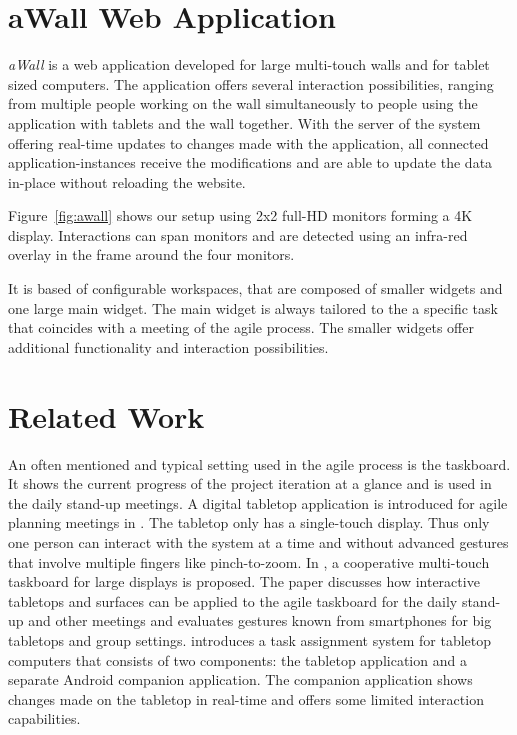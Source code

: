 \documentclass{sigchi}
\begin{document}
\section{aWall Web Application}

\textit{aWall} is a web application developed for large multi-touch walls and for tablet sized computers.
The application offers several interaction possibilities, ranging from multiple people working on the wall simultaneously to people using the application with tablets and the wall together.
With the server of the system offering real-time updates to changes made with the application, all connected application-instances receive the modifications and are able to update the data in-place without reloading the website.

Figure~\ref{fig:awall} shows our setup using 2x2 full-HD monitors forming a 4K display.
Interactions can span monitors and are detected using an infra-red overlay in the frame around the four monitors.

It is based of configurable workspaces, that are composed of smaller widgets and one large main widget.
The main widget is always tailored to the a specific task that coincides with a meeting of the agile process.
The smaller widgets offer additional functionality and interaction possibilities.


\section{Related Work}
An often mentioned and typical setting used in the agile process is the taskboard.
It shows the current progress of the project iteration at a glance and is used in the daily stand-up meetings. 
A digital tabletop application is introduced for agile planning meetings in \cite{Ghanam:4599452}. 
The tabletop only has a single-touch display. 
Thus only one person can interact with the system at a time and without advanced gestures that involve multiple fingers like pinch-to-zoom.
In \cite{Rubart:2014:CMS:2669485.2669551}, a cooperative multi-touch taskboard for large displays is proposed. 
The paper discusses how interactive tabletops and surfaces can be applied to the agile taskboard for the daily stand-up and other meetings and evaluates gestures known from smartphones for big tabletops and group settings.
\cite{Haas:2014:TAV:2669485.2669538} introduces a task assignment system for tabletop computers that consists of two components: the tabletop application and a separate Android companion application.
The companion application shows changes made on the tabletop in real-time and offers some limited interaction capabilities.
\end{document}
